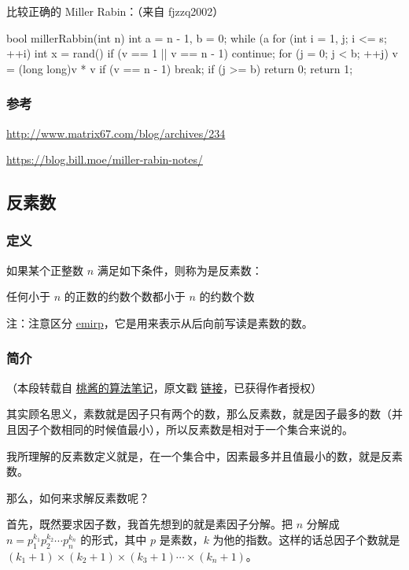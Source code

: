 比较正确的 Miller Rabin：（来自 fjzzq2002）

\begin{cppcode}
bool millerRabbin(int n) {
  int a = n - 1, b = 0;
  while (a %
  for (int i = 1, j; i <= s; ++i) {
    int x = rand() %
    if (v == 1 || v == n - 1) continue;
    for (j = 0; j < b; ++j) {
      v = (long long)v * v %
      if (v == n - 1) break;
    }
    if (j >= b) return 0;
  }
  return 1;
}
\end{cppcode}

\subsubsection{参考}

\url{http://www.matrix67.com/blog/archives/234}

\url{https://blog.bill.moe/miller-rabin-notes/}

\subsection{反素数}

\subsubsection{定义}

如果某个正整数 $n$ 满足如下条件，则称为是反素数：

  任何小于 $n$ 的正数的约数个数都小于 $n$ 的约数个数

注：注意区分 \href{https://en.wikipedia.org/wiki/Emirp}{emirp}，它是用来表示从后向前写读是素数的数。

\subsubsection{简介}

（本段转载自 \href{https://zhuanlan.zhihu.com/c_1005817911142838272}{桃酱的算法笔记}，原文戳 \href{https://zhuanlan.zhihu.com/p/41759808}{链接}，已获得作者授权）

其实顾名思义，素数就是因子只有两个的数，那么反素数，就是因子最多的数（并且因子个数相同的时候值最小），所以反素数是相对于一个集合来说的。

我所理解的反素数定义就是，在一个集合中，因素最多并且值最小的数，就是反素数。

那么，如何来求解反素数呢？

首先，既然要求因子数，我首先想到的就是素因子分解。把 $n$ 分解成 $n=p_{1}^{k_{1}}p_{2}^{k_{2}} \cdots p_{n}^{k_{n}}$ 的形式，其中 $p$ 是素数，$k$ 为他的指数。这样的话总因子个数就是 $(k_1+1) \times (k_2+1) \times (k_3+1) \cdots \times (k_n+1)$。


